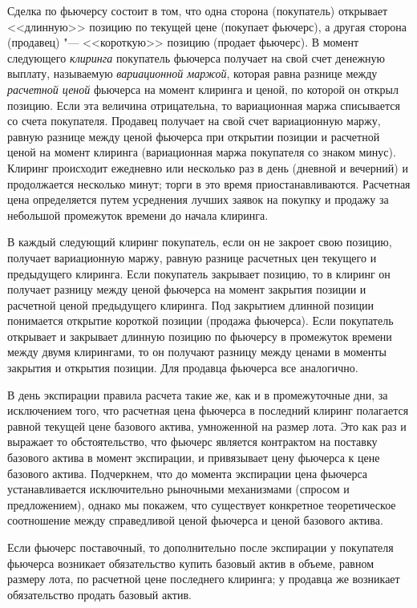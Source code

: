 Сделка по фьючерсу состоит в том, что одна сторона (покупатель) открывает <<длинную>> позицию по текущей цене (покупает фьючерс), а другая сторона (продавец) "--- <<короткую>> позицию (продает фьючерс).
В момент следующего \emph{клиринга} покупатель фьючерса получает на свой счет денежную выплату, называемую \emph{вариационной маржой}, которая равна разнице между \emph{расчетной ценой} фьючерса на момент клиринга и ценой, по которой он открыл позицию.
Если эта величина отрицательна, то вариационная маржа списывается со счета покупателя.
Продавец получает на свой счет вариационную маржу, равную разнице между ценой фьючерса при открытии позиции и расчетной ценой на момент клиринга (вариационная маржа покупателя со знаком минус).
Клиринг происходит ежедневно или несколько раз в день (дневной и вечерний) и продолжается несколько минут; торги в это время приостанавливаются.
Расчетная цена определяется путем усреднения лучших заявок на покупку и продажу за небольшой промежуток времени до начала клиринга.

В каждый следующий клиринг покупатель, если он не закроет свою позицию, получает вариационную маржу, равную разнице расчетных цен текущего и предыдущего клиринга.
Если покупатель закрывает позицию, то в клиринг он получает разницу между ценой фьючерса на момент закрытия позиции и расчетной ценой предыдущего клиринга.
Под закрытием длинной позиции понимается открытие короткой позиции (продажа фьючерса).
Если покупатель открывает и закрывает длинную позицию по фьючерсу в промежуток времени между двумя клирингами, то он получают разницу между ценами в моменты закрытия и открытия позиции. 
Для продавца фьючерса все аналогично.

В день экспирации правила расчета такие же, как и в промежуточные дни, за исключением того, что расчетная цена фьючерса в последний клиринг полагается равной текущей цене базового актива, умноженной на размер лота.
Это как раз и выражает то обстоятельство, что фьючерс является контрактом на поставку базового актива в момент экспирации, и привязывает цену фьючерса к цене базового актива.
Подчеркнем, что до момента экспирации цена фьючерса устанавливается исключительно рыночными механизмами (спросом и предложением), однако мы покажем, что существует конкретное теоретическое соотношение между справедливой ценой фьючерса и ценой базового актива. 

Если фьючерс поставочный, то дополнительно после экспирации у покупателя фьючерса возникает обязательство купить базовый актив в объеме, равном размеру лота, по расчетной цене последнего клиринга; у продавца же возникает обязательство продать базовый актив.

